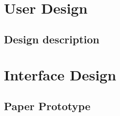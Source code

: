 \chapter{User Design} 


\section{Design description}


\chapter{Interface Design}


\section{Paper Prototype}



